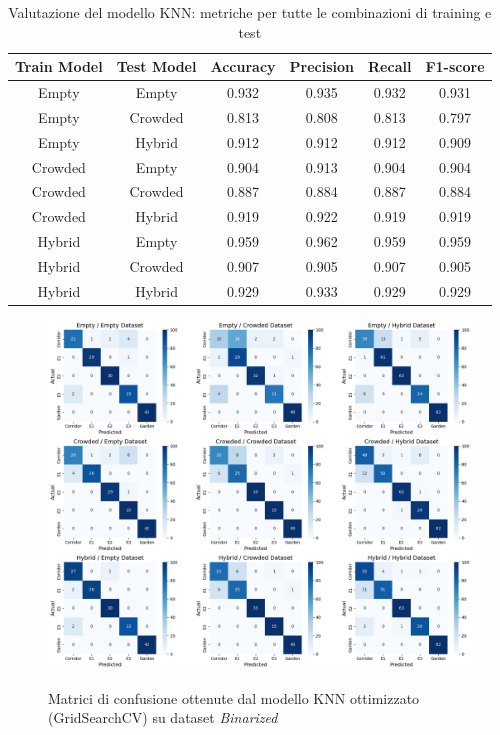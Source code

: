 \documentclass{article}
\begin{document}
\begin{table}[ht!]
    \centering

    \begin{tabular}{c c c c c c }
        \hline
         \textbf{Train Model} & \textbf{Test Model} & Accuracy & Precision & Recall & F1-score \\
        \hline
        Empty   & Empty   & 0.932 & 0.935 & 0.932 & 0.931 \\
        Empty   & Crowded & 0.813 & 0.808 & 0.813 & 0.797 \\
        Empty   & Hybrid  & 0.912 & 0.912 & 0.912 & 0.909 \\
        Crowded & Empty   & 0.904 & 0.913 & 0.904 & 0.904 \\
        Crowded & Crowded & 0.887 & 0.884 & 0.887 & 0.884 \\
        Crowded & Hybrid  & 0.919 & 0.922 & 0.919 & 0.919 \\
        Hybrid  & Empty   & 0.959 & 0.962 & 0.959 & 0.959 \\
        Hybrid  & Crowded & 0.907 & 0.905 & 0.907 & 0.905 \\
        Hybrid  & Hybrid  & 0.929 & 0.933 & 0.929 & 0.929 \\
        \hline
    \end{tabular}
    \caption{Valutazione del modello KNN: metriche per tutte le combinazioni di training e test}
    \label{tab:model_metrics}
\end{table}

\begin{figure}[ht!]
    \centering
    {\includegraphics[scale=0.39]{img/MCGSCV.png}}
    \caption{Matrici di confusione ottenute dal modello KNN ottimizzato (GridSearchCV) su dataset \textit{Binarized}}
    \label{MCGtid}
\end{figure} 
\end{document}
